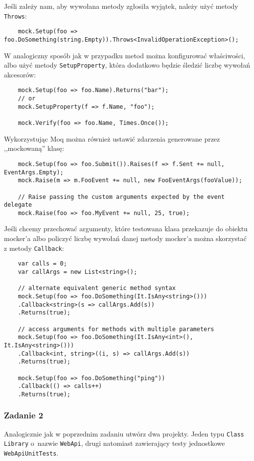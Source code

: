 Jeśli zależy nam, aby wywołana metody zgłosiła wyjątek, należy użyć metody \texttt{Throws}:
\begin{lstlisting}
	mock.Setup(foo => foo.DoSomething(string.Empty)).Throws<InvalidOperationException>();
\end{lstlisting}

W analogiczny sposób jak w przypadku metod można konfigurować właściwości, albo użyć metody \texttt{SetupProperty}, która dodatkowo będzie śledzić liczbę wywołań akcesorów:
\begin{lstlisting}
	mock.Setup(foo => foo.Name).Returns("bar");
	// or
	mock.SetupProperty(f => f.Name, "foo");
	
	mock.Verify(foo => foo.Name, Times.Once());
\end{lstlisting}

Wykorzystując Moq można również ustawić zdarzenia generowane przez ,,mockowaną'' klasę:
\begin{lstlisting}
	mock.Setup(foo => foo.Submit()).Raises(f => f.Sent += null, EventArgs.Empty);
	mock.Raise(m => m.FooEvent += null, new FooEventArgs(fooValue));
	
	// Raise passing the custom arguments expected by the event delegate
	mock.Raise(foo => foo.MyEvent += null, 25, true);
\end{lstlisting}

Jeśli chcemy przechować argumenty, które testowana klasa przekazuje do obiektu mocker'a albo policzyć liczbę wywołań danej metody mocker'a można skorzystać z metody \texttt{Callback}:
\begin{lstlisting}
	var calls = 0;
	var callArgs = new List<string>();
	
	// alternate equivalent generic method syntax
	mock.Setup(foo => foo.DoSomething(It.IsAny<string>()))
	.Callback<string>(s => callArgs.Add(s))
	.Returns(true);
	
	// access arguments for methods with multiple parameters
	mock.Setup(foo => foo.DoSomething(It.IsAny<int>(), It.IsAny<string>()))
	.Callback<int, string>((i, s) => callArgs.Add(s))
	.Returns(true);
	
	mock.Setup(foo => foo.DoSomething("ping"))
	.Callback(() => calls++)
	.Returns(true);
\end{lstlisting}

\subsubsection{Zadanie 2}
Analogicznie jak w poprzednim zadaniu utwórz dwa projekty. Jeden typu \texttt{Class Library} o~nazwie \texttt{WebApi}, drugi natomiast zawierający testy jednostkowe \texttt{WebApiUnitTests}. 

